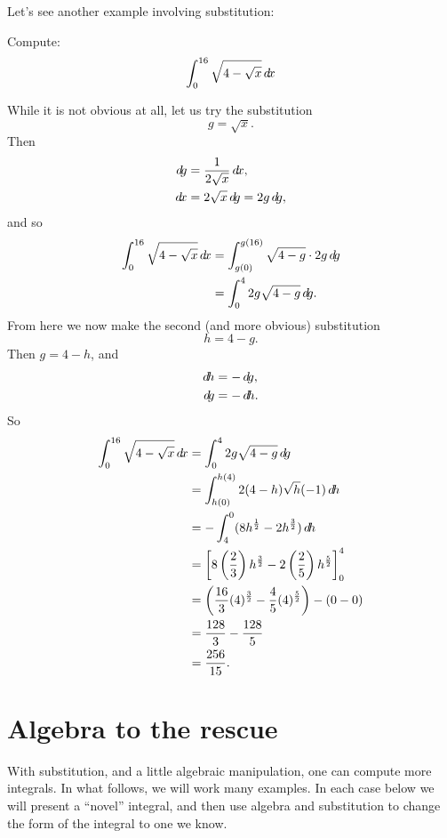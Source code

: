 \documentclass{ximera}
\begin{document}
Let's see another example involving substitution:

\begin{example}
Compute:
\[
\int_0^{16} \sqrt{4 - \sqrt{x}} \mathop{}\!d\! x
\]
\begin{explanation}
While it is not obvious at all, let us try the substitution
\[
g = \sqrt{x}.
\]
Then
\begin{align*}
\d g &= \frac{1}{2 \sqrt{x}} \d x,\\
\d x &= 2 \sqrt{x} \d g = 2g \d g,
\end{align*}
and so
\begin{align*}
\int_0^{16} \sqrt{4 - \sqrt{x}} \mathop{}\!d\! x &= \int_{g(0)}^{g(16)} \sqrt{4-g} \cdot 2g \mathop{}\!d\! g  \\
&= \int_0^4 2g \sqrt{4-g} \mathop{}\!d\! g.
\end{align*}
From here we now make the second (and more obvious) substitution
\[
h = 4-g.
\]
Then $g = 4-h$, and
\begin{align*}
\d h &= - \d g,\\
\d g &= - \d h.
\end{align*}
So
\begin{align*}
\int_0^{16} \sqrt{4 - \sqrt{x}} \d x &= \int_0^4 2g \sqrt{4-g} \d g  \\
&= \int_{h(0)}^{h(4)} 2 (4-h) \sqrt{h} (-1) \d h  \\
&= - \int_4^0 ( 8h^{\frac{1}{2}} - 2h^{\frac{3}{2}} ) \d h  \\
&= \eval{ 8 \left( \frac{2}{3} \right) h^{\frac{3}{2}} - 2 \left( \frac{2}{5} \right) h^{\frac{5}{2}} }_{0}^{4}  \\
&= \left( \frac{16}{3} (4)^{\frac{3}{2}} - \frac{4}{5} (4)^{\frac{5}{2}} \right) - \left( 0 - 0 \right)  \\
&= \frac{128}{3} - \frac{128}{5}   \\
&= \frac{256}{15}.
\end{align*}
\end{explanation}
\end{example}


\section{Algebra to the rescue}

With substitution, and a little algebraic manipulation, one can
compute more integrals. In what follows, we will work many examples.
In each case below we will present a ``novel'' integral, and then use
algebra and substitution to change the form of the integral to one
we know.
\end{document}
